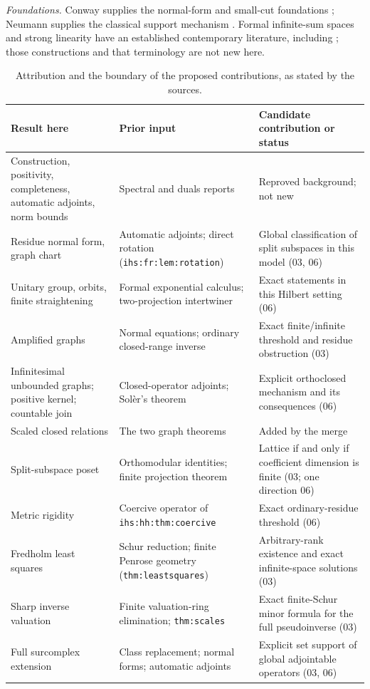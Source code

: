\documentclass[11pt,letterpaper]{article}
\numberwithin{equation}{section}
\theoremstyle{definition}
\theoremstyle{remark}
\newcommand{\replabel}[1]{\nolinkurl{#1}}
\begin{document}
\emph{Foundations.} Conway supplies the normal-form and small-cut
foundations \cite{Conway}; Neumann supplies the classical support mechanism
\cite{Neumann}. Formal infinite-sum spaces and strong linearity have an
established contemporary literature, including \cite{Bagayoko,Freni}; those
constructions and that terminology are not new here.

\begin{table}[!ht]
\centering\small
\caption{Attribution and the boundary of the proposed contributions, as
stated by the sources.}\label{hgeo:tab:attribution}
\begin{tabularx}{\textwidth}{@{}>{\raggedright\arraybackslash}p{}YY@{}}
\toprule
Result here & Prior input & Candidate contribution or status\\
\midrule
Construction, positivity, completeness, automatic adjoints, norm bounds
 & Spectral and duals reports
 & Reproved background; not new\\
Residue normal form, graph chart
 & Automatic adjoints; direct rotation (\replabel{ihs:fr:lem:rotation})
 & Global classification of split subspaces in this model (03, 06)\\
Unitary group, orbits, finite straightening
 & Formal exponential calculus; two-projection intertwiner
 & Exact statements in this Hilbert setting (06)\\
Amplified graphs
 & Normal equations; ordinary closed-range inverse
 & Exact finite/infinite threshold and residue obstruction (03)\\
Infinitesimal unbounded graphs; positive kernel; countable join
 & Closed-operator adjoints; Sol\`er's theorem
 & Explicit orthoclosed mechanism and its consequences (06)\\
Scaled closed relations
 & The two graph theorems
 & Added by the merge\\
Split-subspace poset
 & Orthomodular identities; finite projection theorem
 & Lattice if and only if coefficient dimension is finite (03; one direction 06)\\
Metric rigidity
 & Coercive operator of \replabel{ihs:hh:thm:coercive}
 & Exact ordinary-residue threshold (06)\\
Fredholm least squares
 & Schur reduction; finite Penrose geometry (\replabel{thm:leastsquares})
 & Arbitrary-rank existence and exact infinite-space solutions (03)\\
Sharp inverse valuation
 & Finite valuation-ring elimination; \replabel{thm:scales}
 & Exact finite-Schur minor formula for the full pseudoinverse (03)\\
Full surcomplex extension
 & Class replacement; normal forms; automatic adjoints
 & Explicit set support of global adjointable operators (03, 06)\\
\bottomrule
\end{tabularx}
\end{table}
\end{document}

